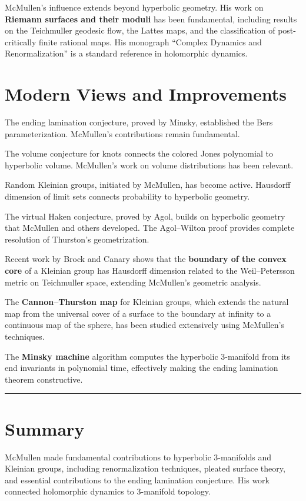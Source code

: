 McMullen's influence extends beyond hyperbolic geometry.  His work
on \textbf{Riemann surfaces and their moduli} has been fundamental,
including results on the Teichmuller geodesic flow, the Lattes
maps, and the classification of post-critically finite rational
maps.  His monograph ``Complex Dynamics and Renormalization'' is a
standard reference in holomorphic dynamics.

\section{Modern Views and Improvements}

The ending lamination conjecture, proved by Minsky, established the
Bers parameterization.  McMullen's contributions remain fundamental.

The volume conjecture for knots connects the colored Jones
polynomial to hyperbolic volume.  McMullen's work on volume
distributions has been relevant.

Random Kleinian groups, initiated by McMullen, has become active.
Hausdorff dimension of limit sets connects probability to
hyperbolic geometry.

The virtual Haken conjecture, proved by Agol, builds on hyperbolic
geometry that McMullen and others developed.  The Agol--Wilton
proof provides complete resolution of Thurston's geometrization.

Recent work by Brock and Canary shows that the \textbf{boundary of
the convex core} of a Kleinian group has Hausdorff dimension
related to the Weil--Petersson metric on Teichmuller space,
extending McMullen's geometric analysis.

The \textbf{Cannon--Thurston map} for Kleinian groups, which
extends the natural map from the universal cover of a surface to
the boundary at infinity to a continuous map of the sphere, has been
studied extensively using McMullen's techniques.

The \textbf{Minsky machine} algorithm computes the hyperbolic
3-manifold from its end invariants in polynomial time, effectively
making the ending lamination theorem constructive.

\begin{center}\rule{0.5\linewidth}{0.5pt}\end{center}

\section*{Summary}

McMullen made fundamental contributions to hyperbolic 3-manifolds
and Kleinian groups, including renormalization techniques, pleated
surface theory, and essential contributions to the ending lamination
conjecture.  His work connected holomorphic dynamics to 3-manifold
topology.

